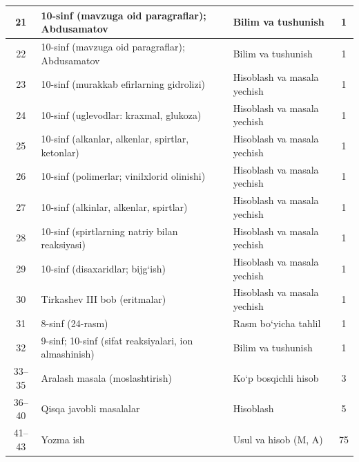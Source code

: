 \documentclass[11pt,a4paper]{article}
\begin{document}
{\begin{longtable}{|c|p{7.2cm}|p{5.4cm}|c|}
21 & 10-sinf (mavzuga oid paragraflar); Abdusamatov & Bilim va tushunish & 1\\\hline
22 & 10-sinf (mavzuga oid paragraflar); Abdusamatov & Bilim va tushunish & 1\\\hline
23 & 10-sinf (murakkab efirlarning gidrolizi) & Hisoblash va masala yechish & 1\\\hline
24 & 10-sinf (uglevodlar: kraxmal, glukoza) & Hisoblash va masala yechish & 1\\\hline
25 & 10-sinf (alkanlar, alkenlar, spirtlar, ketonlar) & Hisoblash va masala yechish & 1\\\hline
26 & 10-sinf (polimerlar; vinilxlorid olinishi) & Hisoblash va masala yechish & 1\\\hline
27 & 10-sinf (alkinlar, alkenlar, spirtlar) & Hisoblash va masala yechish & 1\\\hline
28 & 10-sinf (spirtlarning natriy bilan reaksiyasi) & Hisoblash va masala yechish & 1\\\hline
29 & 10-sinf (disaxaridlar; bijg`ish) & Hisoblash va masala yechish & 1\\\hline
30 & Tirkashev III bob (eritmalar) & Hisoblash va masala yechish & 1\\\hline
31 & 8-sinf (24-rasm) & Rasm bo`yicha tahlil & 1\\\hline
32 & 9-sinf; 10-sinf (sifat reaksiyalari, ion almashinish) & Bilim va tushunish & 1\\\hline
33--35 & Aralash masala (moslashtirish) & Ko`p bosqichli hisob & 3\\\hline
36--40 & Qisqa javobli masalalar & Hisoblash & 5\\\hline
41--43 & Yozma ish & Usul va hisob (M, A) & 75\\\hline
\end{longtable}}
\end{document}
